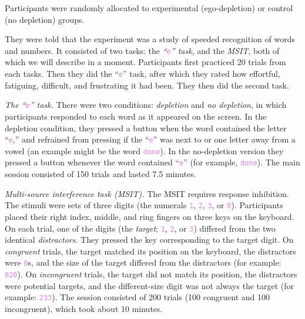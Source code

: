 \documentclass{article}\usepackage[]{graphicx}\usepackage[]{color}
\newcommand{\code}[1]{\textup{\texttt{\textcolor{violet}{#1}}}}
\begin{document}
\begin{mdframed}[frametitle = Method of the multilab replication of the ego-depletion effect, style = style2]\label{box:anExperiment}
\sloppy
{}
Participants were randomly allocated to experimental (ego-depletion) or control (no depletion) groups.

They were told that the experiment was a study of speeded recognition of words and numbers. It consisted of two tasks: the \emph{``\code{e}'' task}, and the \emph{MSIT}, both of which we will describe in a moment. Participants first practiced 20 trials from each tasks. Then they did the ``\code{e}'' task, after which they rated how effortful, fatiguing, difficult, and frustrating it had been. They then did the second task.

\emph{The ``\code{e}'' task.} There were two conditions: \emph{depletion} and \emph{no depletion}, in which participants responded to each word as it appeared on the screen. In the depletion condition, they pressed a button when the word contained the letter ``\code{e},'' and refrained from pressing if the ``\code{e}'' was next to or one letter away from a vowel (an example might be the word \code{done}). In the no-depletion version they pressed a button whenever the word contained ``\code{e}'' (for example, \code{done}). The main session consisted of 150 trials and lasted 7.5 minutes.

\emph{Multi-source interference task (MSIT).} The MSIT requires response inhibition. The stimuli were sets of three digits (the numerals \code{1}, \code{2}, \code{3}, or \code{0}). Participants placed their right index, middle, and ring fingers on three keys on the keyboard. On each trial, one of the digits (the \emph{target}; \code{1}, \code{2}, or \code{3}) differed from the two identical \emph{distractors}. They pressed the key corresponding to the target digit. On \emph{congruent} trials, the target matched its position on the keyboard, the distractors were \code{0}s, and the size of the target differed from the distractors (for example: \code{0{\Large 2}0}). On \emph{incongruent} trials, the target did not match its position, the distractors were potential targets, and the different-size digit was not always the target (for example: \code{2{\Large 3}3}). The session consisted of 200 trials (100 congruent and 100 incongruent), which took about 10 minutes.
\end{mdframed}
\end{document}
